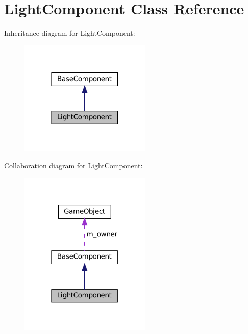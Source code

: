\hypertarget{classLightComponent}{}\section{Light\+Component Class Reference}
\label{classLightComponent}


Inheritance diagram for Light\+Component\+:\nopagebreak
\begin{figure}[H]
\begin{center}
\leavevmode
\includegraphics[width=177pt]{classLightComponent__inherit__graph}
\end{center}
\end{figure}


Collaboration diagram for Light\+Component\+:\nopagebreak
\begin{figure}[H]
\begin{center}
\leavevmode
\includegraphics[width=178pt]{classLightComponent__coll__graph}
\end{center}
\end{figure}
